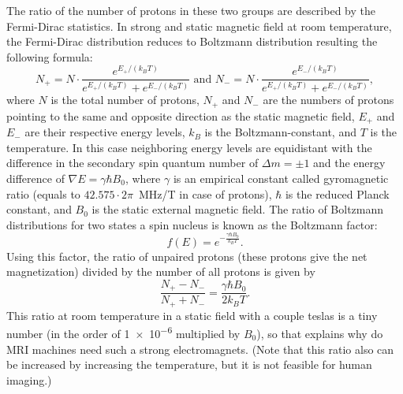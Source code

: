 The ratio of the number of protons in these two groups are described by the Fermi-Dirac statistics. In strong and static magnetic field at room temperature, the Fermi-Dirac distribution reduces to Boltzmann distribution resulting the following formula:
\[N_+ = N \cdot \frac{e^{E_+ / (k_B T)}}{e^{E_+ / (k_B T)} + e^{E_- / (k_B T)}} \text{ and } N_- = N \cdot \frac{e^{E_- / (k_B T)}}{e^{E_+ / (k_B T)} + e^{E_- / (k_B T)}},\]
where $N$ is the total number of protons, $N_+$ and $N_-$ are the numbers of protons pointing to the same and opposite direction as the static magnetic field, $E_+$ and $E_-$ are their respective energy levels, $k_B$ is the Boltzmann-constant, and $T$ is the temperature. In this case neighboring energy levels are equidistant with the difference in the secondary spin quantum number of $\Delta m = \pm 1$ and the energy difference of $\nabla E = \gamma \hbar B_0$, where $\gamma$ is an empirical constant called gyromagnetic ratio (equals to $42.575 \cdot 2\pi$\SI{}{\mega\hertz/\tesla} in case of protons), $\hbar$ is the reduced Planck constant, and $B_0$ is the static external magnetic field. The ratio of Boltzmann distributions for two states a spin \textonehalf nucleus is known as the Boltzmann factor:
\[f(E) = e^{-\frac{\gamma \hbar B_0}{k_B T}}.\]
Using this factor, the ratio of unpaired protons (these protons give the net magnetization) divided by the number of all protons is given by
\[\frac{N_+ - N_-}{N_+ + N_-} = \frac{\gamma \hbar B_0}{2 k_B T}.\]
This ratio at room temperature in a static field with a couple teslas is a tiny number (in the order of \num{1e-6} multiplied by $B_0$), so that explains why do MRI machines need such a strong electromagnets. (Note that this ratio also can be increased by increasing the temperature, but it is not feasible for human imaging.)


